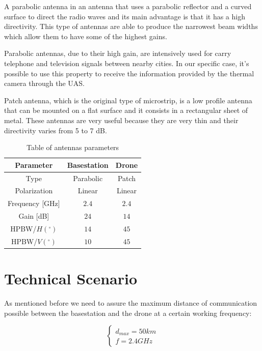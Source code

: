 A parabolic antenna in an antenna that uses a parabolic reflector and a curved surface to direct the radio waves and its main advantage is that it has a high directivity. This type of antennas are able to produce the narrowest beam widths which allow them to have some of the highest gains.

Parabolic antennas, due to their high gain, are intensively used for carry telephone and television signals between nearby cities. In our specific case, it’s possible to use this property to receive the information provided by the thermal camera through the UAS.

Patch antenna, which is the original type of microstrip, is a low profile antenna that can be mounted on a flat surface and it consists in a rectangular sheet of metal. These antennas are very useful because they are very thin and their directivity varies from 5 to 7 dB.

\begin{table}[h!]
\centering
	\begin{tabular}{|c||c|c|}
		\hline
		Parameter & Basestation & Drone\\ \hline\hline
		Type & Parabolic & Patch\\ \hline
		Polarization & Linear & Linear\\ \hline
		Frequency [GHz] & $2.4$ & $2.4$\\ \hline
		Gain [dB] & $24$ & $14$\\ \hline
		HPBW/$H(^{\circ})$ & $14$ & $45$\\ \hline
		HPBW/$V(^{\circ})$ & $10$ & $45$\\ \hline
	\end{tabular}
	\caption{Table of antennas parameters}
	\label{table:1}
\end{table}

\section*{Technical Scenario}
As mentioned before we need to assure the maximum distance of communication possible between the basestation and the drone at a certain working frequency:

\begin{equation*}\label{eq:tech_parameters1} 
 	\begin{cases}
 		d_{max} = 50 km	\\
 		f = 2.4 GHz
 	\end{cases}
\end{equation*}

